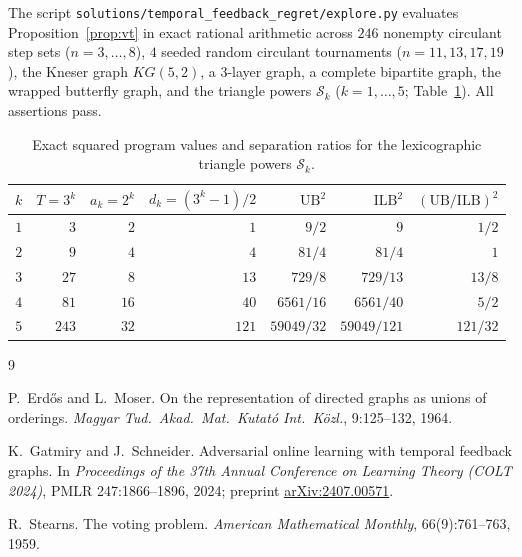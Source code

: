 \documentclass[11pt]{article}
\theoremstyle{plain}
\theoremstyle{definition}
\theoremstyle{remark}
\newcommand{\UB}{\mathrm{UB}}
\newcommand{\ILB}{\mathrm{ILB}}
\begin{document}
The script \texttt{solutions/temporal\_feedback\_regret/explore.py} evaluates Proposition~\ref{prop:vt} in exact rational arithmetic across $246$ nonempty circulant step sets ($n = 3, \dots, 8$), $4$ seeded random circulant tournaments ($n = 11, 13, 17, 19$), the Kneser graph $KG(5, 2)$, a $3$-layer graph, a complete bipartite graph, the wrapped butterfly graph, and the triangle powers $\mathcal{S}_k$ ($k = 1, \dots, 5$; Table~\ref{tab:tri}). All assertions pass.

\begin{table}[htbp]
\centering
\begin{tabular}{@{}rrrrrrr@{}}
\toprule
$k$ & $T = 3^k$ & $a_k = 2^k$ & $d_k = (3^k-1)/2$ & $\UB^2$ & $\ILB^2$ & $(\UB/\ILB)^2$ \\
\midrule
$1$ & $3$   & $2$  & $1$   & $9/2$      & $9$        & $1/2$ \\
$2$ & $9$   & $4$  & $4$   & $81/4$     & $81/4$     & $1$ \\
$3$ & $27$  & $8$  & $13$  & $729/8$    & $729/13$   & $13/8$ \\
$4$ & $81$  & $16$ & $40$  & $6561/16$  & $6561/40$  & $5/2$ \\
$5$ & $243$ & $32$ & $121$ & $59049/32$ & $59049/121$ & $121/32$ \\
\bottomrule
\end{tabular}
\caption{Exact squared program values and separation ratios for the lexicographic triangle powers $\mathcal{S}_k$.}\label{tab:tri}
\end{table}

\begin{thebibliography}{9}

P.~Erd\H{o}s and L.~Moser.
On the representation of directed graphs as unions of orderings.
\emph{Magyar Tud.\ Akad.\ Mat.\ Kutat\'o Int.\ K\"ozl.}, 9:125--132, 1964.

K.~Gatmiry and J.~Schneider.
Adversarial online learning with temporal feedback graphs.
In \emph{Proceedings of the 37th Annual Conference on Learning Theory (COLT 2024)}, PMLR 247:1866--1896, 2024; preprint \href{https://arxiv.org/abs/2407.00571}{arXiv:2407.00571}.

R.~Stearns.
The voting problem.
\emph{American Mathematical Monthly}, 66(9):761--763, 1959.

\end{thebibliography}
\end{document}
